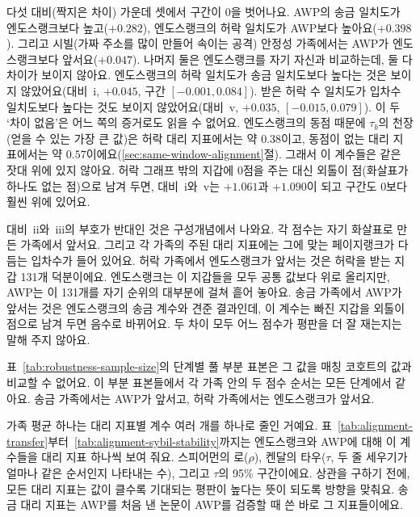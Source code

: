 다섯 대비(짝지은 차이) 가운데 셋에서 구간이 0을 벗어나요. AWP의 송금 일치도가 엔도스랭크보다 높고($+0.282$), 엔도스랭크의 허락 일치도가 AWP보다 높아요($+0.398$). 그리고 시빌(가짜 주소를 많이 만들어 속이는 공격) 안정성 가족에서는 AWP가 엔도스랭크보다 앞서요($+0.047$). 나머지 둘은 엔도스랭크를 자기 자신과 비교하는데, 둘 다 차이가 보이지 않아요. 엔도스랭크의 허락 일치도가 송금 일치도보다 높다는 것은 보이지 않았어요(대비~i, $+0.045$, 구간 $[-0.001,0.084]$). 받은 허락 수 일치도가 입차수 일치도보다 높다는 것도 보이지 않았어요(대비~v, $+0.035$, $[-0.015,0.079]$). 이 두 ‘차이 없음’은 어느 쪽의 증거로도 읽을 수 없어요. 엔도스랭크의 동점 때문에 $\tau_b$의 천장(얻을 수 있는 가장 큰 값)은 허락 대리 지표에서는 약 $0.38$이고, 동점이 없는 대리 지표에서는 약 $0.57$이에요(\ref{sec:same-window-alignment}절). 그래서 이 계수들은 같은 잣대 위에 있지 않아요. 허락 그래프 밖의 지갑에 0점을 주는 대신 외톨이 점(화살표가 하나도 없는 점)으로 남겨 두면, 대비~i와~v는 $+1.061$과 $+1.090$이 되고 구간도 0보다 훨씬 위에 있어요.

대비~ii와~iii의 부호가 반대인 것은 구성개념에서 나와요. 각 점수는 자기 화살표로 만든 가족에서 앞서요. 그리고 각 가족의 주된 대리 지표에는 그에 맞는 페이지랭크가 다듬는 입차수가 들어 있어요. 허락 가족에서 엔도스랭크가 앞서는 것은 허락을 받는 지갑 131개 덕분이에요. 엔도스랭크는 이 지갑들을 모두 공통 값보다 위로 올리지만, AWP는 이 131개를 자기 순위의 대부분에 걸쳐 흩어 놓아요. 송금 가족에서 AWP가 앞서는 것은 엔도스랭크의 송금 계수와 견준 결과인데, 이 계수는 빠진 지갑을 외톨이 점으로 남겨 두면 음수로 바뀌어요. 두 차이 모두 어느 점수가 평판을 더 잘 재는지는 말해 주지 않아요.

표~\ref{tab:robustness-sample-size}의 단계별 풀 부분 표본은 그 값을 매칭 코호트의 값과 비교할 수 없어요. 이 부분 표본들에서 각 가족 안의 두 점수 순서는 모든 단계에서 같아요. 송금 가족에서는 AWP가 앞서고, 허락 가족에서는 엔도스랭크가 앞서요.


가족 평균 하나는 대리 지표별 계수 여러 개를 하나로 줄인 거예요. 표~\ref{tab:alignment-transfer}부터~\ref{tab:alignment-sybil-stability}까지는 엔도스랭크와 AWP에 대해 이 계수들을 대리 지표 하나씩 보여 줘요. 스피어먼의 로($\rho$), 켄달의 타우($\tau$, 두 줄 세우기가 얼마나 같은 순서인지 나타내는 수), 그리고 $\tau$의 95\% 구간이에요. 상관을 구하기 전에, 모든 대리 지표는 값이 클수록 기대되는 평판이 높다는 뜻이 되도록 방향을 맞춰요. 송금 대리 지표는 AWP를 처음 낸 논문이 AWP를 검증할 때 쓴 바로 그 지표들이에요.

